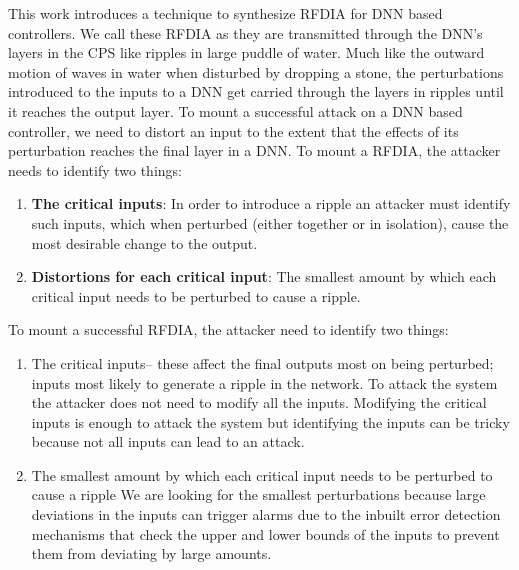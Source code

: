 This work introduces a technique to synthesize \ac{RFDIA} for DNN based controllers. We call these \ac{RFDIA} as they are transmitted through the DNN's layers in the CPS like ripples in large puddle of water. Much like the outward motion of waves in water when disturbed by dropping a stone, the perturbations introduced to the inputs to a DNN get carried through the layers in ripples until it reaches the output layer. To mount a successful attack on a DNN based controller, we need to distort an input to the extent that the effects of its perturbation reaches the final layer in a DNN.  %
To mount a \ac{RFDIA}, the attacker needs to identify two things: 
\begin{enumerate}
	\item \textbf{The critical inputs}: In order to introduce a ripple an attacker must identify such inputs, which when perturbed (either together or in isolation), cause the most desirable change to the output.
	
	\item \textbf{Distortions for each critical input}: The smallest amount by which each critical input needs to be perturbed to cause a ripple.
	
	
\end{enumerate}
\iffalse
To mount a successful \ac{RFDIA}, the attacker need to identify two things: 
\begin{enumerate}
	\item The critical inputs-- these affect the final outputs most on being perturbed; inputs most likely to generate a ripple in the network. 
	To attack the system the attacker does not need to modify all the inputs. Modifying the critical inputs is enough to attack the system but identifying the inputs can be tricky because not all inputs can lead to an attack. 
	\item The smallest amount by which each critical input needs to be perturbed to cause a ripple
	We are looking for the smallest perturbations because large deviations in the inputs can trigger alarms due to the inbuilt error detection mechanisms that 
	check the upper and lower bounds of the inputs to prevent them from deviating by large amounts.
\end{enumerate}
